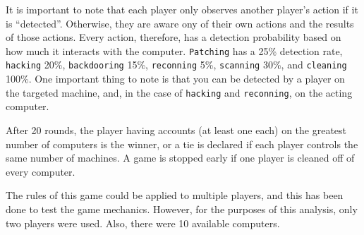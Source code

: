 It is important to note that each player only observes another player's action if it is ``detected''. Otherwise, they are aware ony of their own actions and the results of those actions. Every action, therefore, has a detection probability based on how much it interacts with the computer.  {\tt Patching} has a 25\% detection rate, {\tt hacking} 20\%, {\tt backdooring} 15\%, {\tt reconning} 5\%, {\tt scanning} 30\%, and {\tt cleaning} 100\%. One important thing to note is that you can be detected by a player on the targeted machine, and, in the case of {\tt hacking} and {\tt reconning}, on the acting computer. 

After 20 rounds, the player having accounts (at least one each) on the greatest number of computers is the winner, or a tie is declared if each player controls the same number of machines. A game is stopped early if one player is cleaned off of every computer.

The rules of this game could be applied to multiple players, and this has been done to test the game mechanics. However, for the purposes of this analysis, only two players were used. Also, there were 10 available computers.

